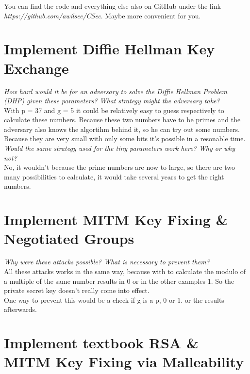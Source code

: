 You can find the code and everything else also on GitHub under the link \textit{https://github.com/awilsee/CSec}. Maybe more convenient for you.


\section{Implement Diffie Hellman Key Exchange}


\textit{How hard would it be for an adversary to solve the Diffie Hellman Problem (DHP) given these parameters? What strategy might the adversary take?}\\
With p = 37 and g = 5 it could be relatively easy to guess respectively to calculate these numbers. Because these two numbers have to be primes and the adversary also knows the algortihm behind it, so  he can try out some numbers. Because they are very small with only some bits it's possible in a resonable time.\\

\textit{Would the same strategy used for the tiny parameters work here? Why or why not?}\\
No, it wouldn't because the prime numbers are now to large, so there are two many possibilities to calculate, it would take several years to get the right numbers.\\

\section{Implement MITM Key Fixing \& Negotiated Groups}


\textit{Why were these attacks possible? What is necessary to prevent them?}\\
All these attacks works in the same way, because with to calculate the modulo of a multiple of the same number results in 0 or in the other examples 1. So the private secret key doesn't really come into effect. \\
One way to prevent this would be a check if g is a p, 0 or 1. or the results afterwards.\\


\section{Implement textbook RSA \& MITM Key Fixing via Malleability}



